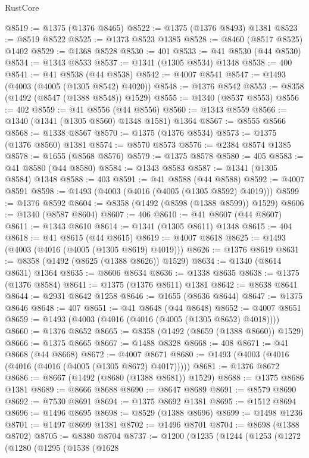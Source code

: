 \begin{lexlean}{RustCore}
\begin{coremodule}
@8519 := @1375 (@1376 @8465)
@8522 := @1375 (@1376 @8493) @1381
@8523 := @8519 @8522
@8525 := @1373 @8523 @1385
@8528 := @8460 (@8517 @8525) @1402
@8529 := @1368 @8528
@8530 := 401
@8533 := @41 @8530 (@44 @8530)
@8534 := @1343 @8533
@8537 := @1341 (@1305 @8534) @1348
@8538 := 400
@8541 := @41 @8538 (@44 @8538)
@8542 := @4007 @8541
@8547 := @1493 (@4003 (@4005 (@1305 @8542) @4020))
@8548 := @1376 @8542
@8553 := @8358 (@1492 (@8547 (@1388 @8548)) @1529)
@8555 := @1340 (@8537 @8553)
@8556 := 402
@8559 := @41 @8556 (@44 @8556)
@8560 := @1343 @8559
@8566 := @1340 (@1341 (@1305 @8560) @1348 @1581) @1364
@8567 := @8555 @8566
@8568 := @1338 @8567
@8570 := @1375 (@1376 @8534)
@8573 := @1375 (@1376 @8560) @1381
@8574 := @8570 @8573
@8576 := @2384 @8574 @1385
@8578 := @1655 (@8568 @8576)
@8579 := @1375 @8578
@8580 := 405
@8583 := @41 @8580 (@44 @8580)
@8584 := @1343 @8583
@8587 := @1341 (@1305 @8584) @1348
@8588 := 403
@8591 := @41 @8588 (@44 @8588)
@8592 := @4007 @8591
@8598 := @1493 (@4003 (@4016 (@4005 (@1305 @8592) @4019)))
@8599 := @1376 @8592
@8604 := @8358 (@1492 (@8598 (@1388 @8599)) @1529)
@8606 := @1340 (@8587 @8604)
@8607 := 406
@8610 := @41 @8607 (@44 @8607)
@8611 := @1343 @8610
@8614 := @1341 (@1305 @8611) @1348
@8615 := 404
@8618 := @41 @8615 (@44 @8615)
@8619 := @4007 @8618
@8625 := @1493 (@4003 (@4016 (@4005 (@1305 @8619) @4019)))
@8626 := @1376 @8619
@8631 := @8358 (@1492 (@8625 (@1388 @8626)) @1529)
@8634 := @1340 (@8614 @8631) @1364
@8635 := @8606 @8634
@8636 := @1338 @8635
@8638 := @1375 (@1376 @8584)
@8641 := @1375 (@1376 @8611) @1381
@8642 := @8638 @8641
@8644 := @2931 @8642 @1258
@8646 := @1655 (@8636 @8644)
@8647 := @1375 @8646
@8648 := 407
@8651 := @41 @8648 (@44 @8648)
@8652 := @4007 @8651
@8659 := @1493 (@4003 (@4016 (@4016 (@4005 (@1305 @8652) @4018))))
@8660 := @1376 @8652
@8665 := @8358 (@1492 (@8659 (@1388 @8660)) @1529)
@8666 := @1375 @8665
@8667 := @1488 @8328
@8668 := 408
@8671 := @41 @8668 (@44 @8668)
@8672 := @4007 @8671
@8680 := @1493 (@4003 (@4016 (@4016 (@4016 (@4005 (@1305 @8672) @4017)))))
@8681 := @1376 @8672
@8686 := @8667 (@1492 (@8680 (@1388 @8681)) @1529)
@8688 := @1375 @8686 @1381
@8689 := @8666 @8688
@8690 := @8647 @8689
@8691 := @8579 @8690
@8692 := @7530 @8691
@8694 := @1375 @8692 @1381
@8695 := @1512 @8694
@8696 := @1496 @8695
@8698 := @8529 (@1388 @8696)
@8699 := @1498 @1236
@8701 := @1497 @8699 @1381
@8702 := @1496 @8701
@8704 := @8698 (@1388 @8702)
@8705 := @8380 @8704
@8737 := @1200
    (@1235
      (@1244
        (@1253
          (@1272
            (@1280
              (@1295
                (@1538
                  (@1628

\end{coremodule}
\end{lexlean}
